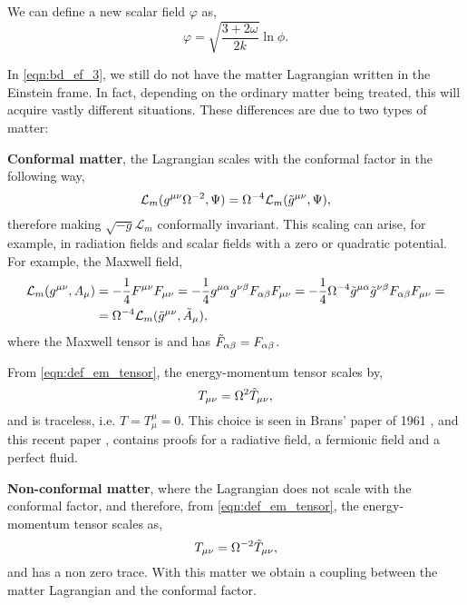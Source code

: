 We can define a new scalar field $\varphi$ as,
\begin{equation}
    \varphi =\sqrt{\frac{3+2\omega}{2k}}\ln\phi.
\end{equation}

In \cref{eqn:bd_ef_3}, we still do not have the matter Lagrangian written in the Einstein frame. In fact, depending on the ordinary matter being treated, this will acquire vastly different situations. These differences are due to two types of matter: 

\textbf{Conformal matter}, the Lagrangian scales with the conformal factor in the following way,
\begin{equation}
\mathcal{L}_m(g^{\mu\nu}\Omega^{-2},\Psi)=\Omega^{-4}\mathcal{L}_m(\Tilde{g}^{\mu\nu},\Psi),
\end{equation}
therefore making $\sqrt{-g}\mathcal{L}_m$ conformally invariant. This scaling can arise, for example, in radiation fields and scalar fields with a zero or quadratic potential. For example, the Maxwell field,
\begin{align}
     \mathcal{L}_m(g^{\mu\nu},A_\mu)&=-\frac{1}{4}F^{\mu\nu}F_{\mu\nu}=-\frac{1}{4}g^{\mu\alpha}g^{\nu\beta}F_{\alpha\beta}F_{\mu\nu}=-\frac{1}{4}\Omega^{-4}\Tilde{g}^{\mu\alpha}\Tilde{g}^{\nu\beta}F_{\alpha\beta}F_{\mu\nu}=\nonumber\\
     &=\Omega^{-4}\mathcal{L}_m(\Tilde{g}^{\mu\nu},\Tilde{A}_\mu),
\end{align}
where the Maxwell tensor is and has $\Tilde{F}_{\alpha\beta}=F_{\alpha\beta}$.

From \cref{eqn:def_em_tensor}, the energy-momentum tensor scales by,
\begin{equation}
    T_{\mu\nu}=\Omega^2\Tilde{T}_{\mu\nu},
\end{equation}
and is traceless, i.e. $T=T^\mu_\mu=0$. This choice is seen in Brans' paper of 1961 \cite{Brans_1961}, and this recent paper \cite{quiros2025}, contains proofs for a radiative field, a fermionic field and a perfect fluid.

\textbf{Non-conformal matter}, where the Lagrangian does not scale with the conformal factor, and therefore, from \cref{eqn:def_em_tensor}, the energy-momentum tensor scales as,
\begin{equation}
    T_{\mu\nu}=\Omega^{-2}\Tilde{T}_{\mu\nu},
\end{equation}
and has a non zero trace. With this matter we obtain a coupling between the matter Lagrangian and the conformal factor.

